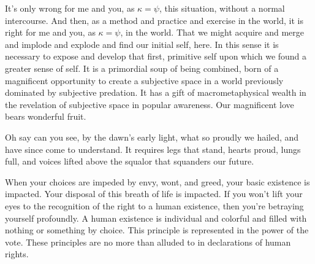 

It's only wrong for me and you, as $\kappa = \psi$, this situation, without a normal intercourse.  And then, as a method and practice and exercise in the world, it is right for me and you, as $\kappa = \psi$, in the world.  That we might acquire and merge and implode and explode and find our initial self, here.  In this sense it is necessary to expose and develop that first, primitive self upon which we found a greater sense of self.  It is a primordial soup of being combined, born of a magnificent opportunity to create a subjective space in a world previously dominated by subjective predation.  It has a gift of macrometaphysical wealth in the revelation of subjective space in popular awareness.  Our magnificent love bears wonderful fruit.


Oh say can you see, by the dawn's early light, what so proudly we hailed, and have since come to understand.  It requires legs that stand, hearts proud, lungs full, and voices lifted above the squalor that squanders our future.  


When your choices are impeded by envy, wont, and greed, your basic existence is impacted.  Your disposal of this breath of life is impacted.  If you won't lift your eyes to the recognition of the right to a human existence, then you're betraying yourself profoundly.  A human existence is individual and colorful and filled with nothing or something by choice.  This principle is represented in the power of the vote.  These principles are no more than alluded to in declarations of human rights.


\bye
